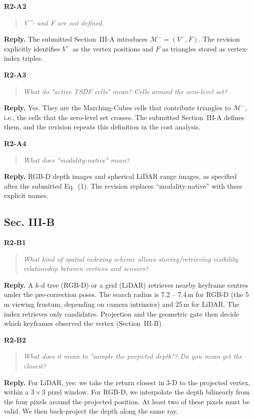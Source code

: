 \documentclass[11pt,a4paper]{article}
\newcommand{\point}[2]{\par\medskip\textbf{#1}\par\begin{quote}\itshape #2\end{quote}}
\newenvironment{reply}{\begingroup\color{replyblue}\textbf{Reply.} }{\par\endgroup}
\begin{document}
\point{R2-A2}{V\textasciicircum{}- and F are not defined.}
\begin{reply}
The submitted Section~III-A introduces $\mathcal M^-=(V^-,F)$. The revision explicitly identifies $V^-$ as the vertex positions and $F$ as triangles stored as vertex-index triples.
\end{reply}

\point{R2-A3}{What do "active TSDF cells" mean? Cells around the zero-level set?}
\begin{reply}
Yes. They are the Marching-Cubes cells that contribute triangles to $\mathcal M^-$, i.e., the cells that the zero-level set crosses. The submitted Section~III-A defines them, and the revision repeats this definition in the cost analysis.
\end{reply}

\point{R2-A4}{What does "modality-native" mean?}
\begin{reply}
RGB-D depth images and spherical LiDAR range images, as specified after the submitted Eq.~(1). The revision replaces ``modality-native'' with these explicit names.
\end{reply}

\subsection*{Sec. III-B}

\point{R2-B1}{What kind of spatial indexing scheme allows storing/retrieving visibility relationship between vertices and sensors?}
\begin{reply}
A $k$-d tree (RGB-D) or a grid (LiDAR) retrieves nearby keyframe centres under the pre-correction poses. The search radius is 7.2 -- 7.4\,m for RGB-D (the 5\,m viewing frustum, depending on camera intrinsics) and 25\,m for LiDAR. The index retrieves only candidates. Projection and the geometric gate then decide which keyframes observed the vertex (Section~III-B).
\end{reply}

\point{R2-B2}{What does it mean to "sample the projected depth"? Do you mean get the closest?}
\begin{reply}
For LiDAR, yes: we take the return closest in 3-D to the projected vertex, within a $3\times3$ pixel window. For RGB-D, we interpolate the depth bilinearly from the four pixels around the projected position. At least two of these pixels must be valid. We then back-project the depth along the same ray.
\end{reply}
\end{document}
